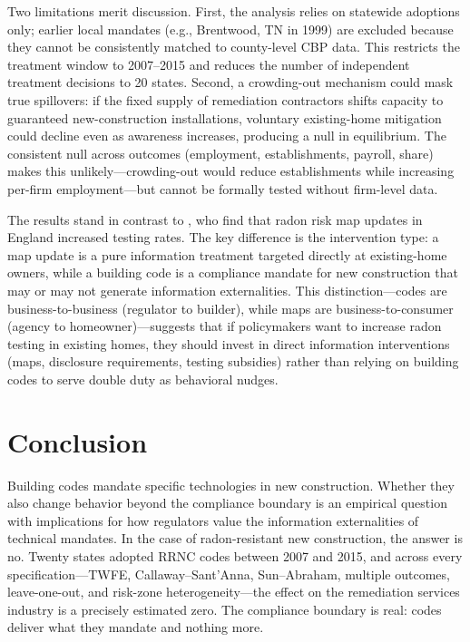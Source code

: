\documentclass[12pt]{article}
\begin{document}
Two limitations merit discussion. First, the analysis relies on statewide adoptions only; earlier local mandates (e.g., Brentwood, TN in 1999) are excluded because they cannot be consistently matched to county-level CBP data. This restricts the treatment window to 2007--2015 and reduces the number of independent treatment decisions to 20 states. Second, a crowding-out mechanism could mask true spillovers: if the fixed supply of remediation contractors shifts capacity to guaranteed new-construction installations, voluntary existing-home mitigation could decline even as awareness increases, producing a null in equilibrium. The consistent null across outcomes (employment, establishments, payroll, share) makes this unlikely---crowding-out would reduce establishments while increasing per-firm employment---but cannot be formally tested without firm-level data.

The results stand in contrast to \citet{pinchbeck2023radon}, who find that radon risk map updates in England increased testing rates. The key difference is the intervention type: a map update is a pure information treatment targeted directly at existing-home owners, while a building code is a compliance mandate for new construction that may or may not generate information externalities. This distinction---codes are business-to-business (regulator to builder), while maps are business-to-consumer (agency to homeowner)---suggests that if policymakers want to increase radon testing in existing homes, they should invest in direct information interventions (maps, disclosure requirements, testing subsidies) rather than relying on building codes to serve double duty as behavioral nudges.

\section{Conclusion}

Building codes mandate specific technologies in new construction. Whether they also change behavior beyond the compliance boundary is an empirical question with implications for how regulators value the information externalities of technical mandates. In the case of radon-resistant new construction, the answer is no. Twenty states adopted RRNC codes between 2007 and 2015, and across every specification---TWFE, Callaway--Sant'Anna, Sun--Abraham, multiple outcomes, leave-one-out, and risk-zone heterogeneity---the effect on the remediation services industry is a precisely estimated zero. The compliance boundary is real: codes deliver what they mandate and nothing more.
\end{document}
